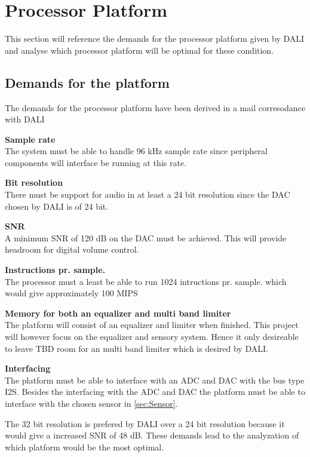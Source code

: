\section{Processor Platform}
This section will reference the demands for the processor platform given by DALI and analyse which processor platform will be optimal for these condition. 

\subsection*{Demands for the platform}
The demands for the processor platform have been derived in a mail corresodance with DALI 

\textbf{Sample rate} \\
The system must be able to handle 96 kHz sample rate since peripheral components will interface be running at this rate.

\textbf{Bit resolution} \\
There must be support for audio in at least a 24 bit resolution since the \gls{DAC} chosen by DALI is of 24 bit.

\textbf{\gls{SNR}} \\
A minimum \gls{SNR} of 120 dB on the \gls{DAC} must be achieved. This will provide headroom for digital volume control.

\textbf{Instructions pr. sample.} \\
The processor must a least be able to run 1024 intructions pr. sample. which would give approximately 100 \gls{MIPS}


\textbf{Memory for both an equalizer and multi band limiter} \\
The platform will consist of an equalizer and limiter when finished. This project will however focus on the equalizer and sensory system. Hence it only desireable to leave TBD room for an multi band limiter which is desired by DALI. 


\textbf{Interfacing} \\
The platform must be able to interface with an ADC and DAC with the bus type \gls{I2S}. Besides the interfacing with the ADC and DAC the platform must be able to interface with the chosen sensor in \autoref{sec:Sensor}.

The 32 bit resolution is prefered by DALI over a 24 bit resolution because it would give a increased \gls{SNR} of 48 dB. These demands lead to the analyzation of which platform would be the most optimal.   

